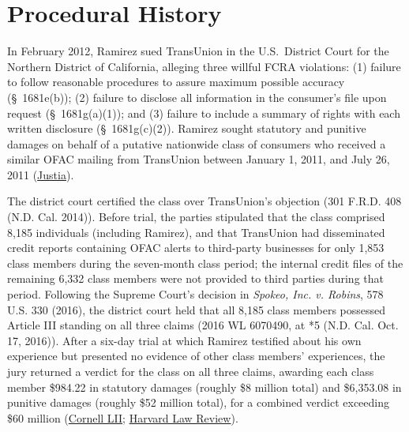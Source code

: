 \documentclass[12pt]{article}
\begin{document}
\section{Procedural History}

In February 2012, Ramirez sued TransUnion in the U.S.~District Court for the Northern District of California, alleging three willful FCRA violations: (1) failure to follow reasonable procedures to assure maximum possible accuracy (\S~1681e(b)); (2) failure to disclose all information in the consumer's file upon request (\S~1681g(a)(1)); and (3) failure to include a summary of rights with each written disclosure (\S~1681g(c)(2)). Ramirez sought statutory and punitive damages on behalf of a putative nationwide class of consumers who received a similar OFAC mailing from TransUnion between January 1, 2011, and July 26, 2011 (\href{https://supreme.justia.com/cases/federal/us/594/20-297/}{Justia}).

The district court certified the class over TransUnion's objection (301 F.R.D. 408 (N.D. Cal. 2014)). Before trial, the parties stipulated that the class comprised 8,185 individuals (including Ramirez), and that TransUnion had disseminated credit reports containing OFAC alerts to third-party businesses for only 1,853 class members during the seven-month class period; the internal credit files of the remaining 6,332 class members were not provided to third parties during that period. Following the Supreme Court's decision in \textit{Spokeo, Inc. v. Robins}, 578 U.S. 330 (2016), the district court held that all 8,185 class members possessed Article III standing on all three claims (2016 WL 6070490, at *5 (N.D. Cal. Oct. 17, 2016)). After a six-day trial at which Ramirez testified about his own experience but presented no evidence of other class members' experiences, the jury returned a verdict for the class on all three claims, awarding each class member \$984.22 in statutory damages (roughly \$8 million total) and \$6,353.08 in punitive damages (roughly \$52 million total), for a combined verdict exceeding \$60 million (\href{https://www.law.cornell.edu/supremecourt/text/20-297}{Cornell LII}; \href{https://harvardlawreview.org/print/vol-135/transunion-v-ramirez/}{Harvard Law Review}).
\end{document}
